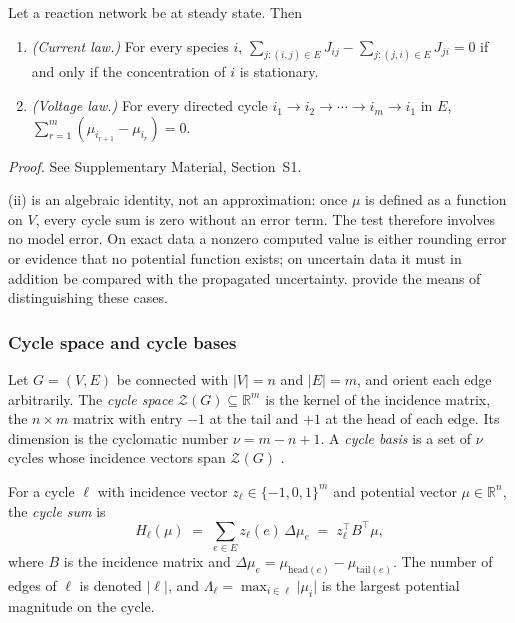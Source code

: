 \documentclass[11pt,a4paper]{article}
\theoremstyle{pstyle}
\theoremstyle{definition}
\theoremstyle{remark}
\newcommand{\R}{\mathbb{R}}
\newcommand{\abs}[1]{\lvert#1\rvert}
\newcommand{\hol}{H}
\begin{document}
\begin{proposition}
\label{prop:kirchhoff}
Let a reaction network be at steady state. Then
\begin{enumerate}[label=(\roman*),leftmargin=2em,itemsep=2pt]
\item \emph{(Current law.)} For every species $i$,
$\sum_{j:(i,j)\in E} J_{ij} - \sum_{j:(j,i)\in E} J_{ji} = 0$ if and
only if the concentration of $i$ is stationary.
\item \emph{(Voltage law.)} For every directed cycle
$i_1\to i_2\to\cdots\to i_m\to i_1$ in $E$,
$\sum_{r=1}^{m}(\mu_{i_{r+1}}-\mu_{i_r}) = 0$.
\end{enumerate}
\end{proposition}

\noindent\emph{Proof.} See Supplementary Material, Section~S1.

\begin{remark}
\label{rem:exact}
(ii) is an algebraic identity, not an
approximation: once $\mu$ is defined as a function on $V$, every cycle
sum is zero without an error term. The test therefore involves no model
error. On exact data a nonzero computed value is either rounding error
or evidence that no potential function exists; on uncertain data it
must in addition be compared with the propagated uncertainty.
 provide the means of
distinguishing these cases.
\end{remark}

\subsubsection{Cycle space and cycle bases}

\begin{definition}
\label{def:cyclespace}
Let $G=(V,E)$ be connected with $\abs{V}=n$ and $\abs{E}=m$, and orient
each edge arbitrarily. The \emph{cycle space} $\mathcal{Z}(G)\subseteq
\R^{m}$ is the kernel of the incidence matrix, the $n\times m$ matrix
with entry $-1$ at the tail and $+1$ at the head of each edge. Its
dimension is the cyclomatic number $\nu = m-n+1$. A \emph{cycle basis}
is a set of $\nu$ cycles whose incidence vectors span $\mathcal{Z}(G)$
\citep{diestel2017,bollobas1998,kavitha2009}.
\end{definition}

\begin{definition}
\label{def:cyclesum}
For a cycle $\ell$ with incidence vector $z_\ell\in\{-1,0,1\}^{m}$ and
potential vector $\mu\in\R^{n}$, the \emph{cycle sum} is
\begin{equation}
  \hol_\ell(\mu) \;=\; \sum_{e\in E} z_\ell(e)\,\Delta\mu_e
  \;=\; z_\ell^{\top} B^{\top}\mu,
  \label{eq:cyclesum}
\end{equation}
where $B$ is the incidence matrix and $\Delta\mu_e = \mu_{\mathrm{head}(e)}
- \mu_{\mathrm{tail}(e)}$. The number of edges of $\ell$ is denoted
$\abs{\ell}$, and $\Lambda_\ell = \max_{i\in\ell}\abs{\mu_i}$ is the
largest potential magnitude on the cycle.
\end{definition}
\end{document}
